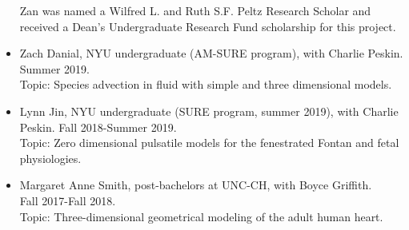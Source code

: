 \documentclass{article} %
\begin{document}
\begin{itemize}
Zan was named a  Wilfred L. and Ruth S.F. Peltz Research Scholar and received a Dean's Undergraduate Research Fund scholarship for this project.
\item Zach Danial, NYU undergraduate (AM-SURE program), with Charlie Peskin.\\ Summer 2019.\\
Topic: Species advection in fluid with simple and three dimensional models.
\item Lynn Jin, NYU undergraduate (SURE program, summer 2019), with Charlie Peskin. Fall 2018-Summer 2019. \\  Topic: Zero dimensional pulsatile models for the fenestrated Fontan and fetal physiologies.
\item Margaret Anne Smith, post-bachelors at UNC-CH, with Boyce Griffith. \\Fall 2017-Fall 2018. \\
Topic: Three-dimensional geometrical modeling of the adult human heart.
\end{itemize}
\end{document}
